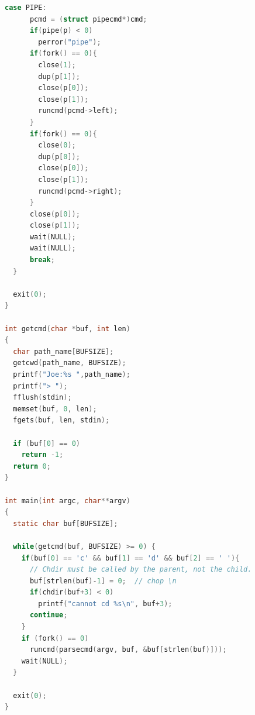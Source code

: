 \documentclass[a4j, twocolumn]{ltjsarticle}
\begin{document}
\begin{lstlisting}[language=C,caption=修正したコード]
    case PIPE:
      pcmd = (struct pipecmd*)cmd;
      if(pipe(p) < 0)
        perror("pipe");
      if(fork() == 0){
        close(1);
        dup(p[1]);
        close(p[0]);
        close(p[1]);
        runcmd(pcmd->left);
      }
      if(fork() == 0){
        close(0);
        dup(p[0]);
        close(p[0]);
        close(p[1]);
        runcmd(pcmd->right);
      }
      close(p[0]);
      close(p[1]);
      wait(NULL);
      wait(NULL);
      break;
  }
  
  exit(0);
}

int getcmd(char *buf, int len)
{
  char path_name[BUFSIZE];
  getcwd(path_name, BUFSIZE);
  printf("Joe:%s ",path_name);
  printf("> ");
  fflush(stdin);
  memset(buf, 0, len);
  fgets(buf, len, stdin);

  if (buf[0] == 0)
    return -1;
  return 0;
}

int main(int argc, char**argv)
{
  static char buf[BUFSIZE];

  while(getcmd(buf, BUFSIZE) >= 0) {
    if(buf[0] == 'c' && buf[1] == 'd' && buf[2] == ' '){
      // Chdir must be called by the parent, not the child.
      buf[strlen(buf)-1] = 0;  // chop \n
      if(chdir(buf+3) < 0)
        printf("cannot cd %s\n", buf+3);
      continue;
    }
    if (fork() == 0)
      runcmd(parsecmd(argv, buf, &buf[strlen(buf)]));
    wait(NULL);
  }

  exit(0);
}
   

  \end{lstlisting}
\end{document}

